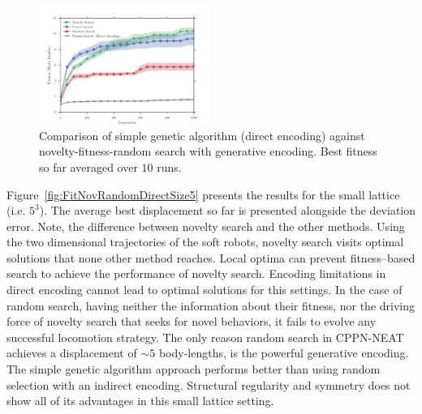 \documentclass{sig-alternate}
\begin{document}
\begin{figure}[t!]
\centering
\includegraphics[width=0.5\textwidth]{../Figures/Results/FitvsNovVsDirSize10.pdf}
\caption{Comparison of simple genetic algorithm (direct encoding) against novelty-fitness-random search with generative encoding. Best fitness so far averaged over $10$ runs.}
\label{fig:FitvsNovVsDirSize10}
\end{figure} 

Figure~\ref{fig:FitNovRandomDirectSize5} presents the results for the small lattice (i.e. $5^3$). The average best displacement so far is presented alongside the deviation error. Note, the difference between novelty search and the other methods. Using the two dimensional trajectories of the soft robots, novelty search visits optimal solutions that none other method reaches. Local optima can prevent fitness--based search to achieve the performance of novelty search. Encoding limitations in direct encoding cannot lead to optimal solutions for this settings. In the case of random search, having neither the information about their fitness, nor the driving force of novelty search that seeks for novel behaviors, it fails to evolve any successful locomotion strategy. The only reason random search in CPPN-NEAT achieves a displacement of $\sim 5$ body-lengths, is the powerful generative encoding. The simple genetic algorithm approach performs better than using random selection with an indirect encoding. Structural regularity and symmetry does not show all of its advantages in this small lattice setting.
\end{document}
